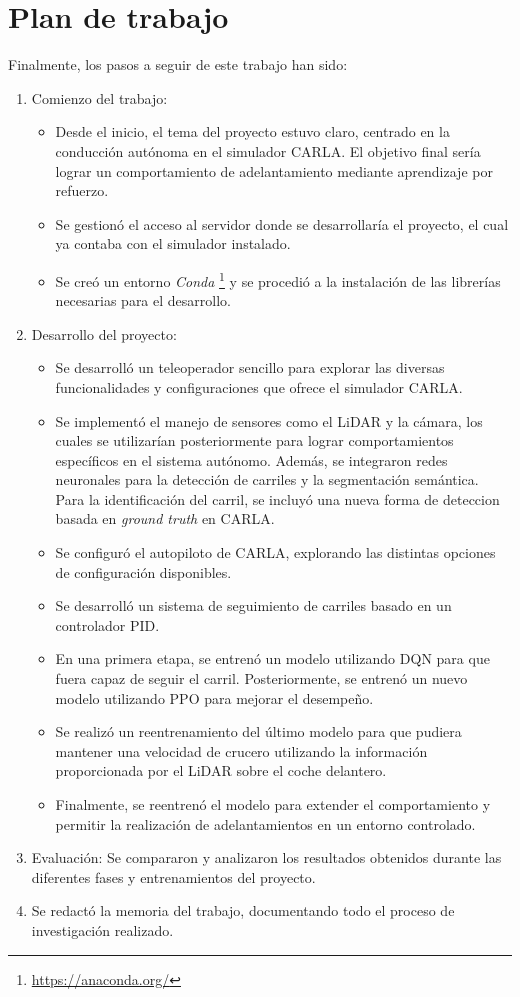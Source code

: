 \section{Plan de trabajo}
\label{sec:plantrabajo}

Finalmente, los pasos a seguir de este trabajo han sido:

\begin{enumerate}
    \item Comienzo del trabajo:
	\begin{itemize}
		\item Desde el inicio, el tema del proyecto estuvo claro, centrado en la conducción autónoma en el simulador CARLA. El objetivo final sería lograr un comportamiento de adelantamiento mediante aprendizaje por refuerzo.
		\item Se gestionó el acceso al servidor donde se desarrollaría el proyecto, el cual ya contaba con el simulador instalado.	
		\item Se creó un entorno \textit{Conda} \footnote{\url{https://anaconda.org/}} y se procedió a la instalación de las librerías necesarias para el desarrollo.
	\end{itemize}

    \item Desarrollo del proyecto:
	\begin{itemize}
		\item Se desarrolló un teleoperador sencillo para explorar las diversas funcionalidades y configuraciones que ofrece el simulador CARLA.
		\item Se implementó el manejo de sensores como el \ac{LiDAR} y la cámara, los cuales se utilizarían posteriormente para lograr comportamientos específicos en el sistema autónomo. Además, se integraron redes neuronales para la detección de carriles y la segmentación semántica. Para la identificación del carril, se incluyó una nueva forma de deteccion basada en  \textit{ground truth} en CARLA.	
		\item Se configuró el autopiloto de CARLA, explorando las distintas opciones de configuración disponibles.
		\item Se desarrolló un sistema de seguimiento de carriles basado en un controlador \ac{PID}.
		\item En una primera etapa, se entrenó un modelo utilizando \ac{DQN} para que fuera capaz de seguir el carril. Posteriormente, se entrenó un nuevo modelo utilizando \ac{PPO} para mejorar el desempeño.
		\item Se realizó un reentrenamiento del último modelo para que pudiera mantener una velocidad de crucero utilizando la información proporcionada por el \ac{LiDAR} sobre el coche delantero.
		\item Finalmente, se reentrenó el modelo para extender el comportamiento y permitir la realización de adelantamientos en un entorno controlado.
	\end{itemize}

    \item Evaluación: Se compararon y analizaron los resultados obtenidos durante las diferentes fases y entrenamientos del proyecto.
    \item Se redactó la memoria del trabajo, documentando todo el proceso de investigación realizado.
\end{enumerate}

